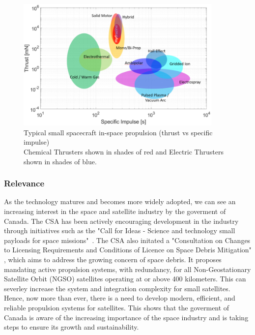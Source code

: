 \begin{figure}[H]
    \centering
    \includegraphics[width=0.9\textwidth]{images/Concepts/thrust vs specific impulse for electric systems.png}
    \captionsetup{justification=centering}
    \caption{Typical small spacecraft in-space propulsion (thrust vs specific impulse) \\ Chemical Thrusters shown in shades of red and Electric Thrusters shown in shades of blue\cite{nasa-inspace-propulsion}.}
    \label{fig:thrust_vs_specific_impulse_propulsion_systems}
\end{figure}

\subsubsection{Relevance}

As the technology matures and becomes more widely adopted, we can see an increasing interest in the space and satellite industry by the goverment of Canada. The \ac{CSA} has been actively encouraging development in the industry through initiatives such as the "Call for Ideas - Science and technology small payloads for space missions"~\cite{csa-call-for-ideas}. The \ac{CSA} also initated a "Consultation on Changes to Licensing Requirements and Conditions of Licence on Space Debris Mitigation" \cite{csa-space-debris-mitigation}, which aims to address the growing concern of space debris. It proposes mandating active propulsion systems, with redundancy, for all Non-Geostationary Satellite Orbit (NGSO) satellites operating at or above 400 kilometers. This can severley increase the system and integration complexity for small satellites. Hence, now more than ever, there is a need to develop modern, efficient, and reliable propulsion systems for satellites. This shows that the goverment of Canada is aware of the increasing importance of the space industry and is taking steps to ensure its growth and sustainability.

